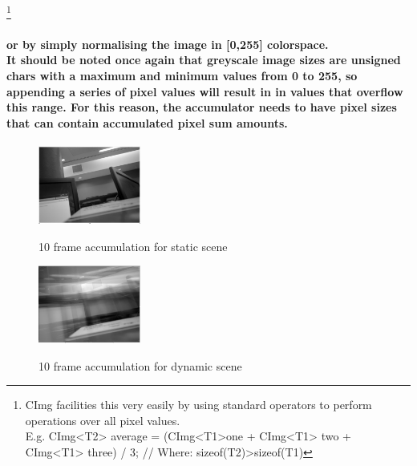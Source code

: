 \documentclass[11pt]{article} %
\begin{document}
{\footnote{CImg facilities this very easily by using standard operators to perform operations over all pixel values.\\ E.g.  CImg<T2> average =  (CImg<T1>one + CImg<T1> two + CImg<T1> three) / 3; // Where: sizeof(T2)>sizeof(T1)} 
\paragraph{
or by simply normalising the image in [0,255] colorspace.
\\It should be noted once again that greyscale image sizes are unsigned chars with a maximum and minimum values from 0 to 255, so appending a series of pixel values will result in in values that overflow this range. For this reason, the accumulator needs to have pixel sizes that can contain accumulated pixel sum amounts.
}
\begin{figure}
	\vspace{-20pt}
	\begin{center}
		\includegraphics[width=0.3\textwidth]{../images/accumstatic}
		\label{accumst}
	\end{center}
	\vspace{-20pt}
	\caption{10 frame accumulation for static scene}
	\vspace{10pt}
	\begin{center}
		\includegraphics[width=0.3\textwidth]{../images/accumdynamic}
		\label{accumdy}
	\end{center}
	\vspace{-20pt}
	\caption{10 frame accumulation for dynamic scene}
\end{figure}
}
\end{document}
